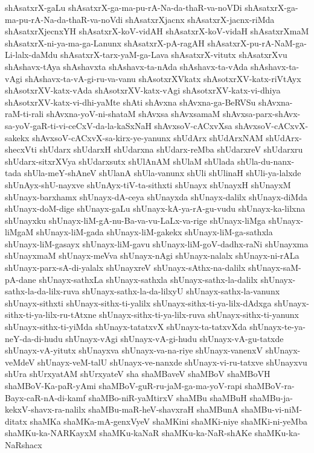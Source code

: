 {shAsatxrX-gaLu
shAsatxrX-ga-ma-pu-rA-Na-da-thaR-va-noVDi
shAsatxrX-ga-ma-pu-rA-Na-da-thaR-va-noVdi
shAsatxrXjacnx
shAsatxrX-jacnx-riMda
shAsatxrXjecnxYH
shAsatxrX-koV-vidAH
shAsatxrX-koV-vidaH
shAsatxrXmaM
shAsatxrX-ni-ya-ma-ga-Lanunx
shAsatxrX-pA-ragAH
shAsatxrX-pu-rA-NaM-ga-Li-lalx-daMdu
shAsatxrX-tarx-yaM-ga-Lava
shAsatxrX-vitutx
shAsatxrXvu
shAshavx-tAya
shAshavxta
shAshavx-ta-nAda
shAshavx-ta-vAda
shAshavx-ta-vAgi
shAshavx-ta-vA-gi-ru-va-vanu
shAsotxrXVkatx
shAsotxrXV-katx-riVtAyx
shAsotxrXV-katx-vAda
shAsotxrXV-katx-vAgi
shAsotxrXV-katx-vi-dhiya
shAsotxrXV-katx-vi-dhi-yaMte
shAti
shAvxna
shAvxna-ga-BeRVSu
shAvxna-raM-ti-rali
shAvxna-yoV-ni-shataM
shAvxsa
shAvxsamaM
shAvxsa-parx-shAvx-sa-yoV-gaR-ti-vi-ceCxV-da-la-kaSxNaH
shAvxsoV-cACxvXsa
shAvxsoV-cACxvX-sakekx
shAvxsoV-cACxvX-sa-kirx-ye-yanunx
shUdArx
shUdArxNAM
shUdArx-shecxVti
shUdarx
shUdarxH
shUdarxna
shUdarx-reMba
shUdarxreV
shUdarxru
shUdarx-sitxrXVya
shUdarxsutx
shUlAnAM
shUlaM
shUlada
shUla-du-nanx-tada
shUla-meY-shAneV
shUlanA
shUla-vanunx
shUli
shUlinaH
shUli-ya-lalxde
shUnAyx-shU-nayxve
shUnAyx-tiV-ta-sithxti
shUnayx
shUnayxH
shUnayxM
shUnayx-barxhamx
shUnayx-dA-ceya
shUnayxda
shUnayx-dalilx
shUnayx-diMda
shUnayx-doM-dige
shUnayx-gaLu
shUnayx-kA-ya-rA-gu-vudu
shUnayx-ka-lilxna
shUnayxku
shUnayx-liM-gA-nu-Ba-va-vu-LaLx-va-rige
shUnayx-liMga
shUnayx-liMgaM
shUnayx-liM-gada
shUnayx-liM-gakekx
shUnayx-liM-ga-sathxla
shUnayx-liM-gasayx
shUnayx-liM-gavu
shUnayx-liM-goV-dadhx-raNi
shUnayxma
shUnayxmaM
shUnayx-meVva
shUnayx-nAgi
shUnayx-nalalx
shUnayx-ni-rALa
shUnayx-parx-sA-di-yalalx
shUnayxreV
shUnayx-sAthx-na-dalilx
shUnayx-saM-pA-dane
shUnayx-sathxLa
shUnayx-sathxla
shUnayx-sathx-la-dalilx
shUnayx-sathx-la-da-lilx-ruva
shUnayx-sathx-la-da-lilxyU
shUnayx-sathx-la-vanunx
shUnayx-sithxti
shUnayx-sithx-ti-yalilx
shUnayx-sithx-ti-ya-lilx-dAdxga
shUnayx-sithx-ti-ya-lilx-ru-tAtxne
shUnayx-sithx-ti-ya-lilx-ruva
shUnayx-sithx-ti-yanunx
shUnayx-sithx-ti-yiMda
shUnayx-tatatxvX
shUnayx-ta-tatxvXda
shUnayx-te-ya-neY-da-di-hudu
shUnayx-vAgi
shUnayx-vA-gi-hudu
shUnayx-vA-gu-tatxde
shUnayx-vA-yitutx
shUnayxva
shUnayx-va-na-riye
shUnayx-vanenxV
shUnayx-veMdeV
shUnayx-veM-talU
shUnayx-ve-nanxde
shUnayx-vi-ru-tatxve
shUnayxvu
shUra
shUrxyatAM
shUrxyateV
sha
shaMBaveV
shaMBoV
shaMBoVH
shaMBoV-Ka-paR-yAmi
shaMBoV-guR-ru-jaM-ga-ma-yoV-rapi
shaMBoV-ra-Bayx-caR-nA-di-kamf
shaMBo-niR-yaMtirxV
shaMBu
shaMBuH
shaMBu-ja-kekxV-shavx-ra-nalilx
shaMBu-maR-heV-shavxraH
shaMBunA
shaMBu-vi-niM-ditatx
shaMKa
shaMKa-mA-genxVyeV
shaMKini
shaMKi-niye
shaMKi-ni-yeMba
shaMKu-ka-NARKayxM
shaMKu-kaNaR
shaMKu-ka-NaR-shAKe
shaMKu-ka-NaRshacx
}
